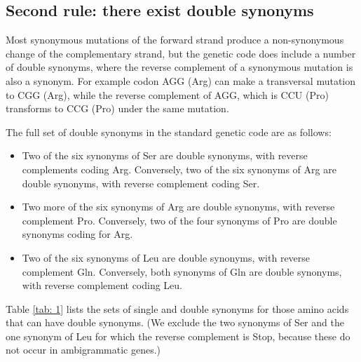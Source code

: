 \documentclass[9pt,lineno]{elife}
\begin{document}
\subsection{Second rule: there exist double synonyms}
\label{sec: 2.2}

Most synonymous mutations of the forward strand produce a non-synonymous change of the 
complementary strand, but the genetic code does include a number of double synonyms, 
where the reverse complement of a synonymous mutation is also a synonym. 
For example codon AGG (Arg) can make a transversal mutation to CGG (Arg), 
while the reverse complement of AGG, which is CCU (Pro) transforms to CCG (Pro) under 
the same mutation. 

The full set of double synonyms in the standard genetic code are as follows:

\begin{itemize}

\item Two of the six synonyms of Ser are double synonyms, with reverse complements coding Arg. 
Conversely, two of the six synonyms of Arg are double synonyms, with reverse complement coding Ser.

\item Two more of the six synonyms of Arg are double synonyms, with reverse complement Pro. 
Conversely, two of the four synonyms of Pro are double synonyms coding for Arg.

\item Two of the six synonyms of Leu are double synonyms, with reverse complement Gln.
Conversely, both synonyms of Gln are double synonyms, with reverse complement coding Leu. 

\end{itemize}

Table \ref{tab: 1} lists the sets of single and double synonyms for those amino acids 
that can have double synonyms. (We exclude the two synonyms of Ser and the one synonym
of Leu for which the reverse complement is Stop, because these do not occur in ambigrammatic
genes.) 
\end{document}
